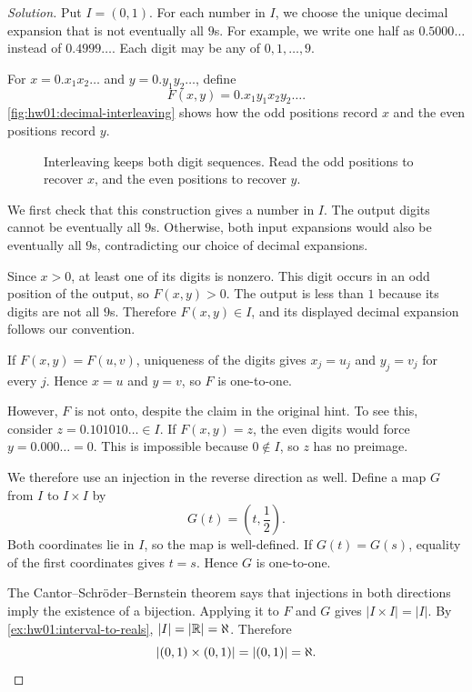 
\begin{proof}[Solution]
Put $I=(0,1)$. For each number in $I$, we choose the unique
decimal expansion that is not eventually all $9$s.
For example, we write one half as $0.5000\ldots$ instead of
$0.4999\ldots$. Each digit may be any of $0,1,\ldots,9$.

For $x=0.x_1x_2\ldots$ and $y=0.y_1y_2\ldots$, define
\[
  F(x,y)=0.x_1y_1x_2y_2\ldots.
\]
\autoref{fig:hw01:decimal-interleaving} shows how the odd
positions record $x$ and the even positions record $y$.

\begin{figure}[h]
  \centering
  
  \caption[Interleaving decimal digits.]{Interleaving keeps both digit sequences. Read the odd
    positions to recover $x$, and the even positions to recover $y$.}
  \label{fig:hw01:decimal-interleaving}
\end{figure}

\handoutonly{\clearpage}

We first check that this construction gives a number in $I$.
The output digits cannot be eventually all $9$s. Otherwise,
both input expansions would also be eventually all $9$s,
contradicting our choice of decimal expansions.

Since $x>0$, at least one of its digits is nonzero. This digit
occurs in an odd position of the output, so $F(x,y)>0$.
The output is less than $1$ because its digits are not all $9$s.
Therefore $F(x,y)\in I$, and its displayed decimal expansion
follows our convention.

If $F(x,y)=F(u,v)$, uniqueness of the digits gives $x_j=u_j$
and $y_j=v_j$ for every $j$. Hence $x=u$ and $y=v$, so $F$
is one-to-one.

However, $F$ is not onto, despite the claim in the original hint.
To see this, consider $z=0.101010\ldots\in I$.
If $F(x,y)=z$, the even digits would force $y=0.000\ldots=0$.
This is impossible because $0\notin I$, so $z$ has no preimage.

We therefore use an injection in the reverse direction as well.
Define a map $G$ from $I$ to $I\times I$ by
\[
  G(t)=\left(t,\frac12\right).
\]
Both coordinates lie in $I$, so the map is well-defined.
If $G(t)=G(s)$, equality of the first coordinates gives $t=s$.
Hence $G$ is one-to-one.

The Cantor--Schr\"oder--Bernstein theorem says that injections
in both directions imply the existence of a bijection.
Applying it to $F$ and $G$ gives $|I\times I|=|I|$.
By \autoref{ex:hw01:interval-to-reals}, $|I|=|\mathbb{R}|=\aleph$.
Therefore
\[
  |(0,1)\times(0,1)|=|(0,1)|=\aleph.\qedhere
\]
\end{proof}
